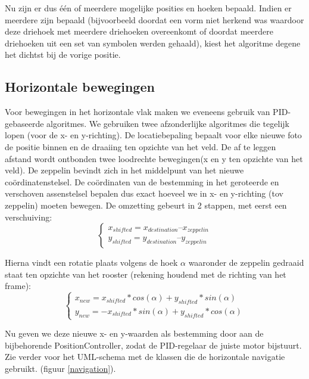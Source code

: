 \documentclass[eind]{penoverslag}
\begin{document}
Nu zijn er dus \'e\'en of meerdere mogelijke posities en hoeken bepaald. Indien er meerdere zijn bepaald (bijvoorbeeld doordat een vorm niet herkend was waardoor deze driehoek met meerdere driehoeken overeenkomt of doordat meerdere driehoeken uit een set van symbolen werden gehaald), kiest het algoritme degene het dichtst bij de vorige positie.

\subsection{Horizontale bewegingen}
Voor bewegingen in het horizontale vlak maken we eveneens gebruik van PID-gebaseerde algoritmes. We gebruiken twee afzonderlijke algoritmes die tegelijk lopen (voor de x- en y-richting). De locatiebepaling bepaalt voor elke nieuwe foto de positie binnen en de draaiing ten opzichte van het veld. De af te leggen afstand wordt ontbonden twee loodrechte bewegingen(x en y ten opzichte van het veld). De zeppelin bevindt zich in het middelpunt van het nieuwe co\"ordinatenstelsel. De co\"{o}rdinaten van de bestemming in het geroteerde en verschoven assenstelsel bepalen dus exact hoeveel we in x- en y-richting (tov zeppelin) moeten bewegen. De omzetting gebeurt in 2 stappen, met eerst een verschuiving:
\begin{equation}
 \begin{cases}
  x_{shifted} = x_{destination} – x_{zeppelin}\\
  y_{shifted} = y_{destination} – y_{zeppelin}
 \end{cases}
\end{equation}



Hierna vindt een rotatie plaats volgens de hoek $\alpha$ waaronder de zeppelin gedraaid staat ten opzichte van het rooster (rekening houdend met de richting van het frame):
\begin{equation}
 \begin{cases}
 x_{new} = x_{shifted}*cos(\alpha) + y_{shifted}*sin(\alpha)\\
y_{new} = -x_{shifted}*sin(\alpha) + y_{shifted}*cos(\alpha)
 \end{cases}
\end{equation}

Nu geven we deze nieuwe x- en y-waarden als bestemming door aan de bijbehorende PositionController, zodat de PID-regelaar de juiste motor bijstuurt. Zie verder voor het UML-schema met de klassen die de horizontale navigatie gebruikt. (figuur \ref{navigation}).
\end{document}
